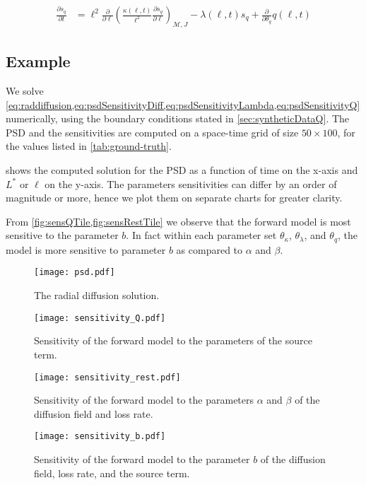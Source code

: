 \begin{equation}\label{eq:psdSensitivityQ}
    \begin{aligned}
        \frac{\partial{s_{q}}}{\partial{t}} &= \ell^2 \frac{\partial}{\partial{\ell}} \left( 
            \frac{\kappa(\ell, t)}{\ell^{2}} \frac{\partial{s_{q}}}{\partial{\ell}} 
        \right)_{\mathcal{M}, J}
         - \lambda(\ell, t) s_{q}
         + \frac{\partial}{\partial{\theta_{q}}}q(\ell, t)
    \end{aligned}
\end{equation}

\subsection*{Example}

We solve \cref{eq:raddiffusion,eq:psdSensitivityDiff,eq:psdSensitivityLambda,eq:psdSensitivityQ} 
numerically, using the boundary conditions stated in \cref{sec:syntheticDataQ}. The PSD and the 
sensitivities are computed on a space-time grid of size $50\times100$, for the values listed in 
\cref{tab:ground-truth}.

 shows the computed solution for the PSD as a function of time on the x-axis and 
$L^{\ast}$ or $\ell$ on the y-axis. The parameters sensitivities can differ by an order of 
magnitude or more, hence we plot them on separate charts for greater clarity.

From \cref{fig:sensQTile,fig:sensRestTile} we observe that the forward model is most sensitive to 
the parameter $b$. In fact within each parameter set $\theta_{\kappa}$, $\theta_{\lambda}$, and 
$\theta_{q}$, the model is more sensitive to parameter $b$ as compared to $\alpha$ and $\beta$. 


\begin{figure}[ht]\label{fig:psdTile}
    \texttt{[image: psd.pdf]}
    \caption{The radial diffusion solution.}
\end{figure}

\begin{figure}[ht]\label{fig:sensQTile}
    \texttt{[image: sensitivity\_Q.pdf]}
    \caption{Sensitivity of the forward model to the parameters of the source term.}
\end{figure}

\begin{figure}[ht]\label{fig:sensRestTile}
    \texttt{[image: sensitivity\_rest.pdf]}
    \caption{
        Sensitivity of the forward model to the parameters $\alpha$ and $\beta$ of 
        the diffusion field and loss rate.}
\end{figure}

\begin{figure}[ht]\label{fig:sensbTile}
    \texttt{[image: sensitivity\_b.pdf]}
    \caption{
        Sensitivity of the forward model to the parameter $b$ of 
        the diffusion field, loss rate, and the source term.}
\end{figure}
